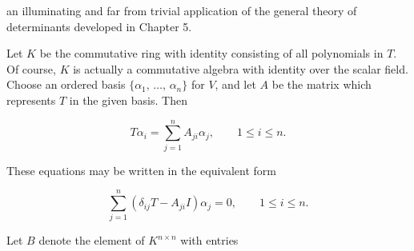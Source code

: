 an illuminating and far from trivial application of the general theory of determinants developed in Chapter 5.

Let \(K\) be the commutative ring with identity consisting of all polynomials in \(T\). Of course, \(K\) is actually a commutative algebra with identity over the scalar field. Choose an ordered basis \(\{\alpha_{1},\,\ldots,\,\alpha_{n}\}\) for \(V\), and let \(A\) be the matrix which represents \(T\) in the given basis. Then

\[T\alpha_{i}=\sum\limits_{j=1}^{n}A_{ji}\alpha_{j},\qquad 1\leq i\leq n.\]

These equations may be written in the equivalent form

\[\sum\limits_{j=1}^{n}(\delta_{ij}T-A_{ji}I)\alpha_{j}=0,\qquad 1\leq i\leq n.\]

Let \(B\) denote the element of \(K^{n\times n}\) with entries

\ 
